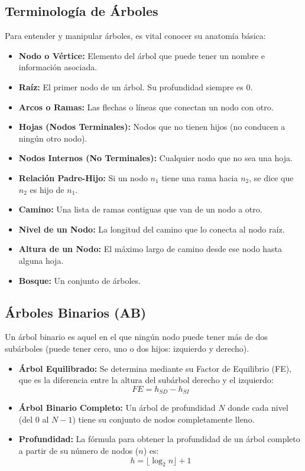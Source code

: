 \documentclass{article}
\begin{document}
	\subsection{Terminología de Árboles}
	Para entender y manipular árboles, es vital conocer su anatomía básica:
	\begin{itemize}
		\item \textbf{Nodo o Vértice:} Elemento del árbol que puede tener un nombre e información asociada.
		\item \textbf{Raíz:} El primer nodo de un árbol. Su profundidad siempre es 0.
		\item \textbf{Arcos o Ramas:} Las flechas o líneas que conectan un nodo con otro.
		\item \textbf{Hojas (Nodos Terminales):} Nodos que no tienen hijos (no conducen a ningún otro nodo).
		\item \textbf{Nodos Internos (No Terminales):} Cualquier nodo que no sea una hoja.
		\item \textbf{Relación Padre-Hijo:} Si un nodo $n_{1}$ tiene una rama hacia $n_{2}$, se dice que $n_{2}$ es hijo de $n_{1}$.
		\item \textbf{Camino:} Una lista de ramas contiguas que van de un nodo a otro.
		\item \textbf{Nivel de un Nodo:} La longitud del camino que lo conecta al nodo raíz.
		\item \textbf{Altura de un Nodo:} El máximo largo de camino desde ese nodo hasta alguna hoja.
		\item \textbf{Bosque:} Un conjunto de árboles.
	\end{itemize}
	
	\subsection{Árboles Binarios (AB)}
	Un árbol binario es aquel en el que ningún nodo puede tener más de dos subárboles (puede tener cero, uno o dos hijos: izquierdo y derecho).
	
	\begin{itemize}
		\item \textbf{Árbol Equilibrado:} Se determina mediante su Factor de Equilibrio (FE), que es la diferencia entre la altura del subárbol derecho y el izquierdo:
		$$FE = h_{SD} - h_{SI}$$
		\item \textbf{Árbol Binario Completo:} Un árbol de profundidad $N$ donde cada nivel (del 0 al $N-1$) tiene su conjunto de nodos completamente lleno.
		\item \textbf{Profundidad:} La fórmula para obtener la profundidad de un árbol completo a partir de su número de nodos ($n$) es:
		$$h = \lfloor \log_{2}n \rfloor + 1$$
	\end{itemize}
	
\end{document}
